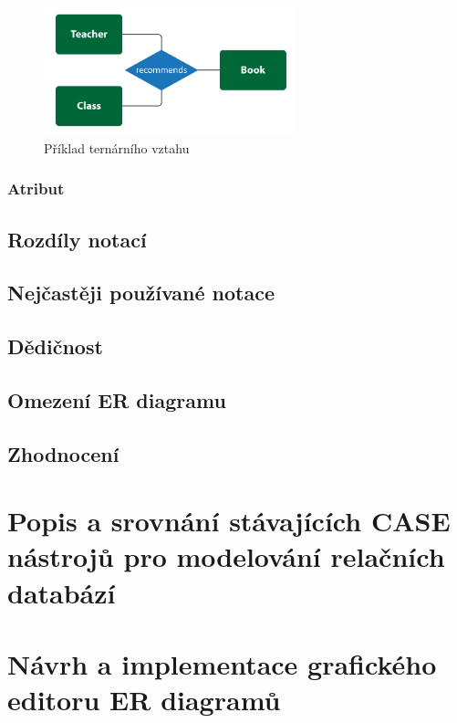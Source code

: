 \documentclass[czech,bachelor,public,dept460,male,oneside]{diploma}
\begin{document}
	\begin{figure}[!h]
		\centering
		\includegraphics[width=0.65\textwidth]{Figures/TernaryRelationship}
		\caption{Příklad ternárního vztahu}
	\end{figure}
	
	\subsubsection{Atribut}
	
	\subsection{Rozdíly notací}
	
	\subsection{Nejčastěji používané notace} %
	
	\subsection{Dědičnost} %
	
	\subsection{Omezení ER diagramu}
	
	\subsection{Zhodnocení}

\newpage
\section{Popis a srovnání stávajících CASE nástrojů pro modelování relačních databází}

\newpage
\section{Návrh a implementace grafického editoru ER diagramů}
\end{document}
